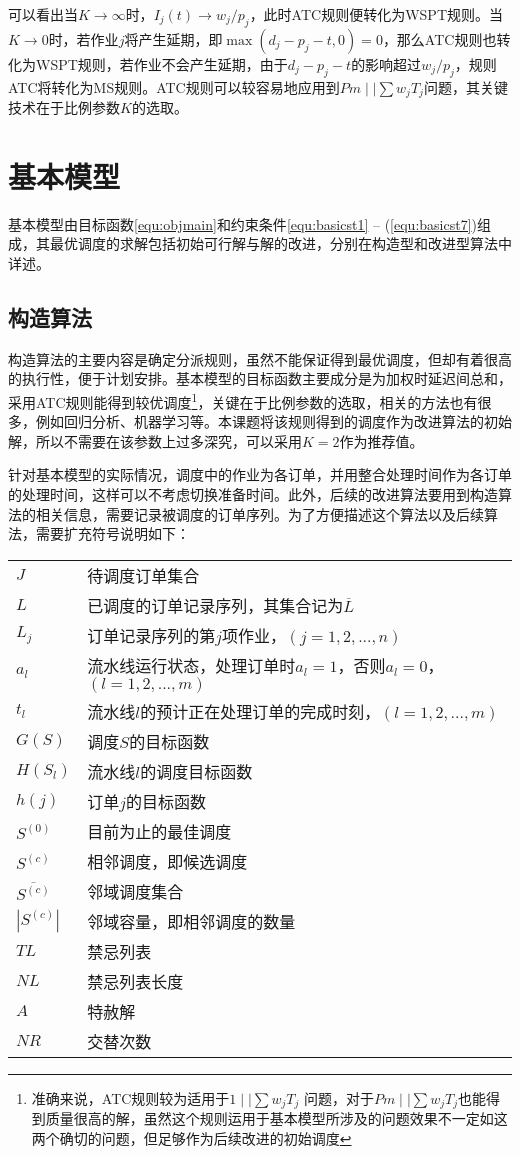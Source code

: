 可以看出当$K \to \infty$时，$I_j(t) \to w_j/p_j$，此时ATC规则便转化为WSPT规则。当$K \to 0$时，若作业$j$将产生延期，即$\max(d_j - p_j -t , 0 ) = 0$，那么ATC规则也转化为WSPT规则，若作业不会产生延期，由于$d_j - p_j - t$的影响超过$w_j/p_j$，规则ATC将转化为MS规则。ATC规则可以较容易地应用到$Pm\mid\mid \sum w_jT_j$问题，其关键技术在于比例参数$K$的选取。

\section{基本模型}
基本模型由目标函数\eqref{equ:objmain}和约束条件\eqref{equ:basicst1} -- (\ref{equ:basicst7})组成，其最优调度的求解包括初始可行解与解的改进，分别在构造型和改进型算法中详述。
\subsection{构造算法}
构造算法的主要内容是确定分派规则，虽然不能保证得到最优调度，但却有着很高的执行性，便于计划安排。基本模型的目标函数主要成分是为加权时延迟间总和，采用ATC规则能得到较优调度\footnote{准确来说，ATC规则较为适用于$1\mid\mid \sum w_jT_j$ 问题，对于$Pm\mid\mid \sum w_jT_j$也能得到质量很高的解，虽然这个规则运用于基本模型所涉及的问题效果不一定如这两个确切的问题，但足够作为后续改进的初始调度}，关键在于比例参数的选取，相关的方法也有很多，例如回归分析、机器学习等。本课题将该规则得到的调度作为改进算法的初始解，所以不需要在该参数上过多深究，可以采用$K = 2$作为推荐值\cite{bilge2007tabu}。

针对基本模型的实际情况，调度中的作业为各订单，并用整合处理时间作为各订单的处理时间，这样可以不考虑切换准备时间。此外，后续的改进算法要用到构造算法的相关信息，需要记录被调度的订单序列。为了方便描述这个算法以及后续算法，需要扩充符号说明如下：

\begin{tabular}{ll}
$J$ & 待调度订单集合\\
$L$ & 已调度的订单记录序列，其集合记为$\overline{L}$\\
$L_j$ & 订单记录序列的第$j$项作业，$(j = 1,2,...,n)$\\
$a_l$ & 流水线运行状态，处理订单时$a_l = 1$，否则$a_l = 0$，$(l = 1,2,...,m)$\\
$t_l$ & 流水线$l$的预计正在处理订单的完成时刻，$(l = 1,2,...,m)$\\
$G(S)$& 调度$S$的目标函数\\
$H(S_l)$ & 流水线$l$的调度目标函数\\
$h(j)$ & 订单$j$的目标函数\\
$S^{(0)}$ & 目前为止的最佳调度\\
$S^{(c)}$& 相邻调度，即候选调度\\
$\overline{S^{(c)}}$& 邻域调度集合\\
$|S^{(c)}|$& 邻域容量，即相邻调度的数量\\
$TL$ & 禁忌列表\\
$NL$ &禁忌列表长度\\
$A$ & 特赦解\\
$NR$ &交替次数
\end{tabular}

